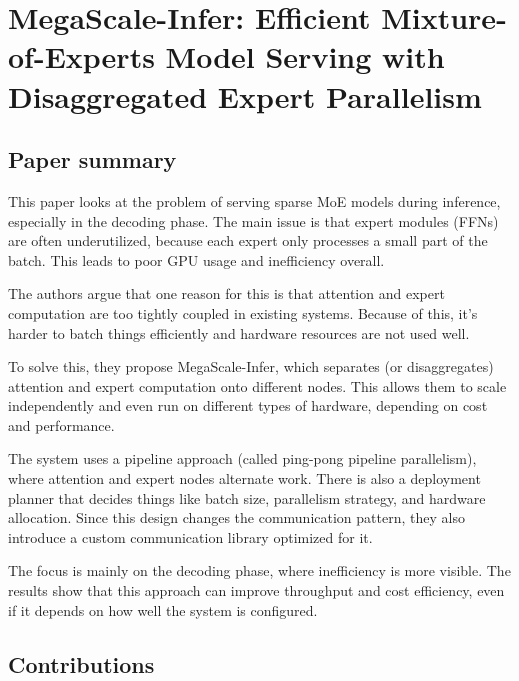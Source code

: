 \documentclass[a4paper, 12pt]{article}
\begin{document}
\section*{MegaScale-Infer: Efficient Mixture-of-Experts Model Serving with\\Disaggregated Expert Parallelism}
\subsection{Paper summary}

This paper looks at the problem of serving sparse MoE models during inference, especially in the decoding phase. The main issue is that expert modules (FFNs) are often underutilized, because each expert only processes a small part of the batch. This leads to poor GPU usage and inefficiency overall.

The authors argue that one reason for this is that attention and expert computation are too tightly coupled in existing systems. Because of this, it’s harder to batch things efficiently and hardware resources are not used well.

To solve this, they propose MegaScale-Infer, which separates (or disaggregates) attention and expert computation onto different nodes. This allows them to scale independently and even run on different types of hardware, depending on cost and performance.

The system uses a pipeline approach (called ping-pong pipeline parallelism), where attention and expert nodes alternate work. There is also a deployment planner that decides things like batch size, parallelism strategy, and hardware allocation. Since this design changes the communication pattern, they also introduce a custom communication library optimized for it.

The focus is mainly on the decoding phase, where inefficiency is more visible. The results show that this approach can improve throughput and cost efficiency, even if it depends on how well the system is configured.

\subsection{Contributions}
\end{document}
